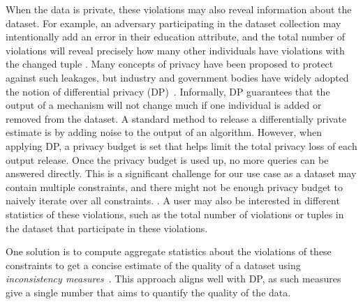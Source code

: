 When the data is private, these violations may also reveal information about the dataset. For example, an adversary participating in the dataset collection may intentionally add an error in their education attribute, and the total number of violations will reveal precisely how many other individuals have violations with the changed tuple . Many concepts of privacy have been proposed to protect against such leakages, but industry and government bodies have widely adopted the notion of differential privacy (DP)~\cite{dwork2006calibrating}. Informally, DP guarantees that the output of a mechanism will not change much if one individual is added or removed from the dataset. A standard method to release a differentially private estimate is by adding noise to the output of an algorithm. However, when applying DP, a privacy budget is set that helps limit the total privacy loss of each output release. Once the privacy budget is used up, no more queries can be answered directly. This is a significant challenge for our use case as a dataset may contain multiple constraints, and there might not be enough privacy budget to naively iterate over all constraints.  . A user may also be interested in different statistics of these violations, such as the total number of violations or tuples in the dataset that participate in these violations. 

One solution is to compute aggregate statistics about the violations of these constraints to get a concise estimate of the quality of a dataset using {\em inconsistency measures}~\cite{thimm2017compliance, parisi2019inconsistency, LivshitsKTIKR21}. 
This approach aligns well with DP, as such measures give a single number that aims to quantify the quality of the data. 

